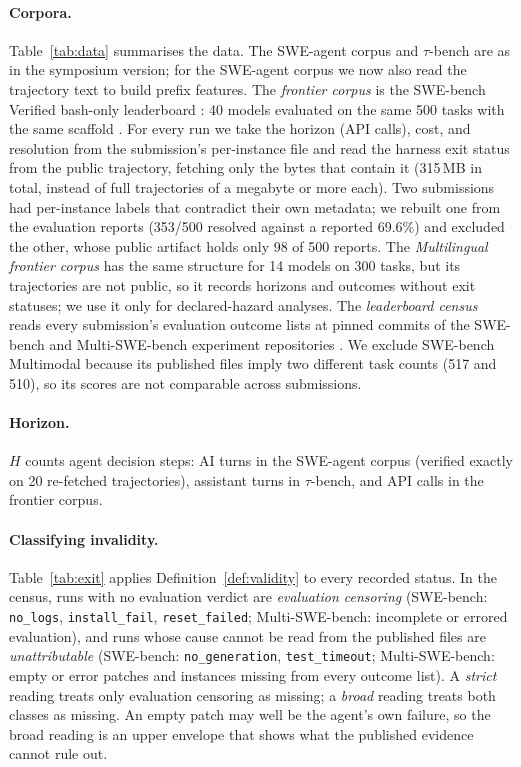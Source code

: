 \documentclass[11pt]{article}
\theoremstyle{definition}
\theoremstyle{remark}
\begin{document}
\paragraph{Corpora.} Table~\ref{tab:data} summarises the data. The SWE-agent
corpus \citep{yang2024sweagent,nebius2024trajectories} and $\tau$-bench
\citep{yao2025taubench,agentsuite2026taubench} are as in the symposium version;
for the SWE-agent corpus we now also read the trajectory text to build prefix
features. The \emph{frontier corpus} is the SWE-bench Verified bash-only
leaderboard \citep{swebench2026experiments,openai2024swebenchverified}: 40
models evaluated on the same 500 tasks with the same scaffold
\citep{minisweagent2025}. For every run we take the horizon (API calls), cost,
and resolution from the submission's per-instance file and read the harness
exit status from the public trajectory, fetching only the bytes that contain it
(315\,MB in total, instead of full trajectories of a megabyte or more each). Two submissions had per-instance labels that
contradict their own metadata; we rebuilt one from the evaluation reports
(353/500 resolved against a reported 69.6\%) and excluded the other, whose
public artifact holds only 98 of 500 reports. The \emph{Multilingual frontier
corpus} has the same structure for 14 models on 300 tasks, but its trajectories
are not public, so it records horizons and outcomes without exit statuses; we use
it only for declared-hazard analyses. The \emph{leaderboard census} reads every
submission's evaluation outcome lists at pinned commits of the SWE-bench and
Multi-SWE-bench experiment repositories
\citep{swebench2026experiments,multiswebench2025experiments}. We exclude SWE-bench
Multimodal because its published files imply two different task counts (517 and
510), so its scores are not comparable across submissions.

\paragraph{Horizon.} $H$ counts agent decision steps: AI turns in the SWE-agent
corpus (verified exactly on 20 re-fetched trajectories), assistant turns in
$\tau$-bench, and API calls in the frontier corpus.

\paragraph{Classifying invalidity.} Table~\ref{tab:exit} applies
Definition~\ref{def:validity} to every recorded status. In the census, runs with
no evaluation verdict are \emph{evaluation censoring} (SWE-bench:
\texttt{no\_logs}, \texttt{install\_fail}, \texttt{reset\_failed};
Multi-SWE-bench: incomplete or errored evaluation), and runs whose cause cannot
be read from the published files are \emph{unattributable} (SWE-bench:
\texttt{no\_generation}, \texttt{test\_timeout}; Multi-SWE-bench: empty or error
patches and instances missing from every outcome list). A \emph{strict} reading
treats only evaluation censoring as missing; a \emph{broad} reading treats both
classes as missing. An empty patch may well be the agent's own failure, so the
broad reading is an upper envelope that shows what the published evidence cannot
rule out.
\end{document}
